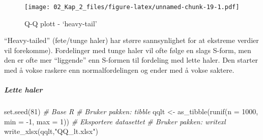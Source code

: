 \documentclass[
]{article}
\newenvironment{Shaded}{\begin{snugshade}}{\end{snugshade}}
\newcommand{\AttributeTok}[1]{\textcolor[rgb]{0.77,0.63,0.00}{#1}}
\newcommand{\CommentTok}[1]{\textcolor[rgb]{0.56,0.35,0.01}{\textit{#1}}}
\newcommand{\DecValTok}[1]{\textcolor[rgb]{0.00,0.00,0.81}{#1}}
\newcommand{\FunctionTok}[1]{\textcolor[rgb]{0.00,0.00,0.00}{#1}}
\newcommand{\NormalTok}[1]{#1}
\newcommand{\OtherTok}[1]{\textcolor[rgb]{0.56,0.35,0.01}{#1}}
\newcommand{\SpecialCharTok}[1]{\textcolor[rgb]{0.00,0.00,0.00}{#1}}
\newcommand{\StringTok}[1]{\textcolor[rgb]{0.31,0.60,0.02}{#1}}
\begin{document}
\begin{figure}
\centering
\texttt{[image: 02\_Kap\_2\_files/figure-latex/unnamed-chunk-19-1.pdf]}
\caption{\label{fig:unnamed-chunk-19}Q-Q plott - `heavy-tail'}
\end{figure}

``Heavy-tailed'' (fete/tunge haler) har større sannsynlighet for at ekstreme verdier vil forekomme). Fordelinger med tunge haler vil ofte følge en slags S-form, men den er ofte mer ``liggende'' enn S-formen til fordeling med lette haler. Den starter med å vokse raskere enn normalfordelingen og ender med å vokse saktere.

\hypertarget{lette-haler}{%
\subparagraph{Lette haler}\label{lette-haler}}

\begin{Shaded}
\begin{Highlighting}[]
\FunctionTok{set.seed}\NormalTok{(}\DecValTok{81}\NormalTok{)}
\CommentTok{\# Base R}
\CommentTok{\# Bruker pakken: tibble}
\NormalTok{qqlt }\OtherTok{\textless{}{-}} \FunctionTok{as\_tibble}\NormalTok{(}\FunctionTok{runif}\NormalTok{(}\AttributeTok{n =} \DecValTok{1000}\NormalTok{, }\AttributeTok{min =} \SpecialCharTok{{-}}\DecValTok{1}\NormalTok{, }\AttributeTok{max =} \DecValTok{1}\NormalTok{))}
\CommentTok{\# Eksportere datasettet}
\CommentTok{\# Bruker pakken: writexl}
\FunctionTok{write\_xlsx}\NormalTok{(qqlt,}\StringTok{"QQ\_lt.xlsx"}\NormalTok{)}
\end{Highlighting}
\end{Shaded}

\begin{Shaded}
\end{Shaded}
\end{document}
